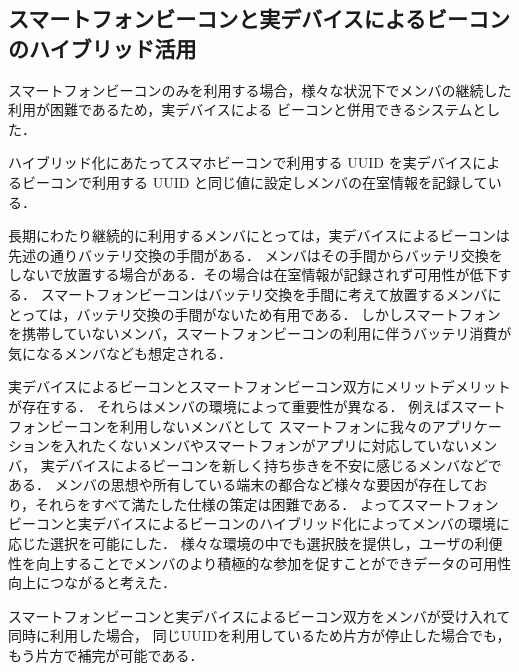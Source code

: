 \subsection{スマートフォンビーコンと実デバイスによるビーコンのハイブリッド活用}
スマートフォンビーコンのみを利用する場合，様々な状況下でメンバの継続した利用が困難であるため，実デバイスによる
ビーコンと併用できるシステムとした．

ハイブリッド化にあたってスマホビーコンで利用する UUID を実デバイスによるビーコンで利用する UUID と同じ値に設定しメンバの在室情報を記録している．





長期にわたり継続的に利用するメンバにとっては，実デバイスによるビーコンは先述の通りバッテリ交換の手間がある．
メンバはその手間からバッテリ交換をしないで放置する場合がある．その場合は在室情報が記録されず可用性が低下する．
スマートフォンビーコンはバッテリ交換を手間に考えて放置するメンバにとっては，バッテリ交換の手間がないため有用である．
しかしスマートフォンを携帯していないメンバ，スマートフォンビーコンの利用に伴うバッテリ消費が気になるメンバなども想定される．

実デバイスによるビーコンとスマートフォンビーコン双方にメリットデメリットが存在する．
それらはメンバの環境によって重要性が異なる．
例えばスマートフォンビーコンを利用しないメンバとして
スマートフォンに我々のアプリケーションを入れたくないメンバやスマートフォンがアプリに対応していないメンバ，
実デバイスによるビーコンを新しく持ち歩きを不安に感じるメンバなどである．
メンバの思想や所有している端末の都合など様々な要因が存在しており，それらをすべて満たした仕様の策定は困難である．
よってスマートフォンビーコンと実デバイスによるビーコンのハイブリッド化によってメンバの環境に応じた選択を可能にした．
様々な環境の中でも選択肢を提供し，ユーザの利便性を向上することでメンバのより積極的な参加を促すことができデータの可用性向上につながると考えた．



スマートフォンビーコンと実デバイスによるビーコン双方をメンバが受け入れて同時に利用した場合，
同じUUIDを利用しているため片方が停止した場合でも，もう片方で補完が可能である．

